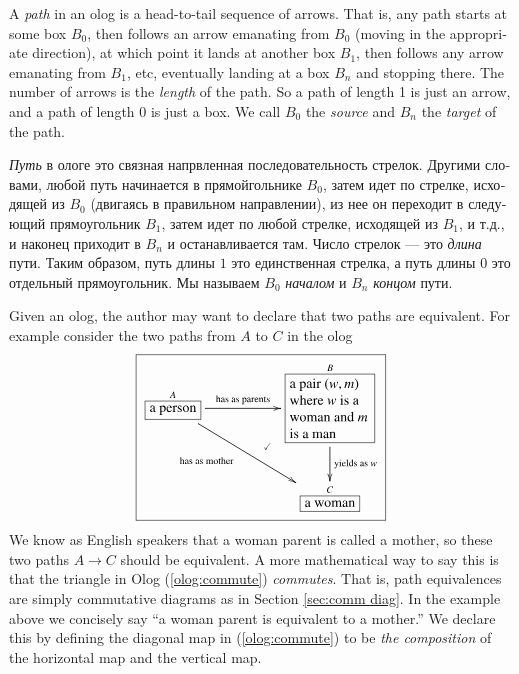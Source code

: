 \documentclass{book}
\def\tn{\textnormal}
\def\to{\rightarrow}
\def\rr{\raggedright}
\newcommand{\LA}[2]{\ar[#1]^-{\tn {#2}}}
\newcommand{\LAL}[2]{\ar[#1]_-{\tn {#2}}}
\newcommand{\obox}[3]{\stackrel{#1}{\fbox{\parbox{#2}{#3}}}}
\newcommand{\smbox}[2]{\stackrel{#1}{\fbox{#2}}}
\theoremstyle{theoremENG}
\theoremstyle{lemmaENG}
\theoremstyle{propositionENG}
\theoremstyle{corollaryENG}
\theoremstyle{factENG}
\theoremstyle{remarkENG}
\theoremstyle{exampleENG}
\theoremstyle{warningENG}
\theoremstyle{questionENG}
\theoremstyle{guessENG}
\theoremstyle{answerENG}
\theoremstyle{constructionENG}
\theoremstyle{rulesENG}
\theoremstyle{excENG}
\theoremstyle{appENG}
\theoremstyle{definitionENG}
\theoremstyle{notationENG}
\theoremstyle{conjectureENG}
\theoremstyle{postulateENG}
\theoremstyle{theoremRUS}
\theoremstyle{lemmaRUS}
\theoremstyle{propositionRUS}
\theoremstyle{corollaryRUS}
\theoremstyle{factRUS}
\theoremstyle{remarkRUS}
\theoremstyle{exampleRUS}
\theoremstyle{warningRUS}
\theoremstyle{questionRUS}
\theoremstyle{guessRUS}
\theoremstyle{answerRUS}
\theoremstyle{constructionRUS}
\theoremstyle{rulesRUS}
\theoremstyle{excRUS}
\theoremstyle{appRUS}
\theoremstyle{definitionRUS}
\theoremstyle{notationRUS}
\theoremstyle{conjectureRUS}
\theoremstyle{postulateRUS}
\begin{document}
\begin{english}
A {\em path} in an olog is a head-to-tail sequence of arrows. That is, any path starts at some box $B_0$, then follows an arrow emanating from $B_0$ (moving in the appropriate direction), at which point it lands at another box $B_1$, then follows any arrow emanating from $B_1$, etc, eventually landing at a box $B_n$ and stopping there. The number of arrows is the {\em length} of the path. So a path of length 1 is just an arrow, and a path of length 0 is just a box. We call $B_0$ the {\em source} and $B_n$ the {\em target} of the path.

\begin{russian}{\em Путь} в ологе это связная напрвленная последовательность стрелок. Другими словами, любой путь начинается в прямойгольнике $B_0$, затем идет по стрелке, исходящей из $B_0$ (двигаясь в правильном направлении), из нее он переходит в следующий прямоугольник $B_1$, затем идет по любой стрелке, исходящей из $B_1$, и т.д., и наконец приходит в $B_n$ и останавливается там. Число стрелок — это {\em длина} пути. Таким образом, путь длины $1$ это единственная стрелка, а путь длины $0$ это отдельный прямоугольник. Мы называем $B_0$ {\em началом} и $B_n$ {\em концом} пути. \end{russian}

Given an olog, the author may want to declare that two paths are equivalent.  For example consider the two paths from $A$ to $C$ in the olog 
\begin{align}\label{olog:commute}\fbox{\xymatrixnocompile{\smbox{A}{a person}\LA{rr}{has as parents}\LAL{drr}{\parbox{.8in}{has as mother}}&&\obox{B}{.8in}{\rr a pair $(w,m)$ where $w$ is a woman and $m$ is a man}\ar@{}[dll]|(.4){\checkmark}\LA{d}{yields as $w$}\\&&\smbox{C}{a woman}}}\end{align}  We know as English speakers that a woman parent is called a mother, so these two paths $A\to C$ should be equivalent.  A more mathematical way to say this is that the triangle in Olog (\ref{olog:commute}) {\em commutes}. That is, path equivalences are simply commutative diagrams as in Section \ref{sec:comm diag}. In the example above we concisely say “a woman parent is equivalent to a mother.”  We declare this by defining the diagonal map in (\ref{olog:commute}) to be {\em the composition} of the horizontal map and the vertical map. 


\end{english}
\end{document}
